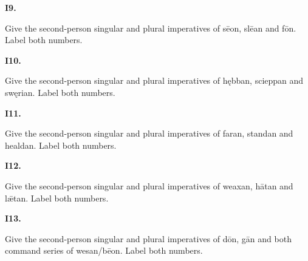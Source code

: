 \par\begin{minipage}{\linewidth}\raggedright
\textbf{I9.}

Give the second-person singular and plural imperatives of sēon, slēan and fōn. Label both numbers.

\end{minipage}\par\addvspace{4pt}

\par\begin{minipage}{\linewidth}\raggedright
\textbf{I10.}

Give the second-person singular and plural imperatives of hębban, scieppan and swęrian. Label both numbers.

\end{minipage}\par\addvspace{4pt}

\par\begin{minipage}{\linewidth}\raggedright
\textbf{I11.}

Give the second-person singular and plural imperatives of faran, standan and healdan. Label both numbers.

\end{minipage}\par\addvspace{4pt}

\par\begin{minipage}{\linewidth}\raggedright
\textbf{I12.}

Give the second-person singular and plural imperatives of weaxan, hātan and lǣtan. Label both numbers.

\end{minipage}\par\addvspace{4pt}

\par\begin{minipage}{\linewidth}\raggedright
\textbf{I13.}

Give the second-person singular and plural imperatives of dōn, gān and both command series of wesan/\allowbreak{}bēon. Label both numbers.

\end{minipage}\par\addvspace{4pt}

